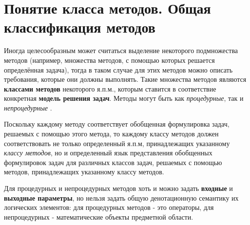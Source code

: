 \section{Понятие класса методов. Общая классификация методов}

Иногда целесообразным может считаться выделение некоторого подмножества методов (например, множества методов, с помощью которых решается определённая задача), тогда в таком случае для этих методов можно описать требования, которые они должны выполнять. Такие множества методов являются \textbf{классами методов} некоторого я.п.м., которым ставится в соответствие конкретная \textbf{модель решения задач}. Методы могут быть как \textit{процедурные}, так и \textit{непроцедурные} \cite{Turner2007}.

\begin{SCn}
\begin{scnindent}
\end{scnindent}
\begin{scnindent}
    \begin{scnindent}
    \end{scnindent}
\end{scnindent}
\end{SCn}

Поскольку каждому методу соответствует обобщенная формулировка задач, решаемых с помощью этого метода, то каждому классу методов должен соответствовать не только определенный я.п.м, принадлежащих указанному \textit{классу методов}, но и определенный язык представления обобщенных формулировок задач для различных классов задач, решаемых с помощью методов, принадлежащих указанному классу методов.

Для процедурных и непроцедурных методов хоть и можно задать \textbf{входные} и \textbf{выходные параметры}, но нельзя задать общую денотационную семантику их логических элементов: для процедурных методов - это операторы, для непроцедурных - математические объекты предметной области.

